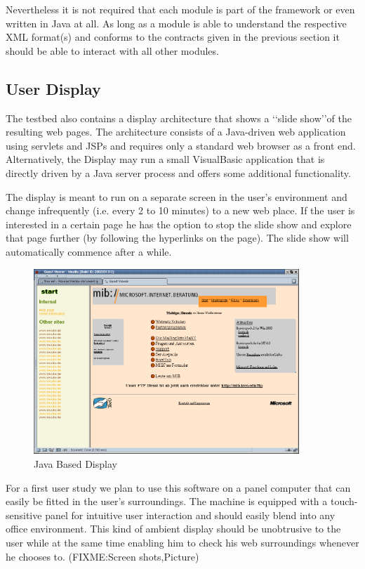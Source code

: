 \documentclass[a4paper]{danarticle}
\theoremstyle{remark}
\begin{document}
      Nevertheless it is not required that each module is part of the 
      framework or even written in Java at all. As long as a module is able to 
      understand the respective XML format(s) and conforms to the contracts 
      given in the previous section it should be able to interact with all 
      other modules.
    \subsection{User Display}
      The testbed also contains a display architecture that shows a \lq\lq slide
      show\rq\rq of the resulting web pages. The architecture consists of a
      Java-driven web application using servlets and JSPs and requires only a
      standard web browser as a front end. Alternatively, the Display may run a
      small VisualBasic application that is directly driven by a Java server
      process and offers some additional functionality.
      
      The display is meant to run on a separate screen in the user's environment
      and change infrequently (i.e. every 2 to 10 minutes) to a new web place.
      If the user is interested in a certain page he has the option to stop the
      slide show and explore that page further (by following the hyperlinks on
      the page). The slide show will automatically commence after a while.
      \begin{figure}[ht]
       \centering
	 \includegraphics[width=10cm]{javaclient}
	 \caption{Java Based Display}
	 \label{javaclient}
       \end{figure}
      
      For a first user study we plan to use this software on a panel computer 
      that can easily be fitted in the user's surroundings. The machine is 
      equipped with a touch-sensitive panel for intuitive user interaction and 
      should easily blend into any office environment. This kind of ambient 
      display should be unobtrusive to the user while at the same time enabling 
      him to check his web surroundings whenever he chooses to.
      (FIXME:Screen shots,Picture)
\end{document}
